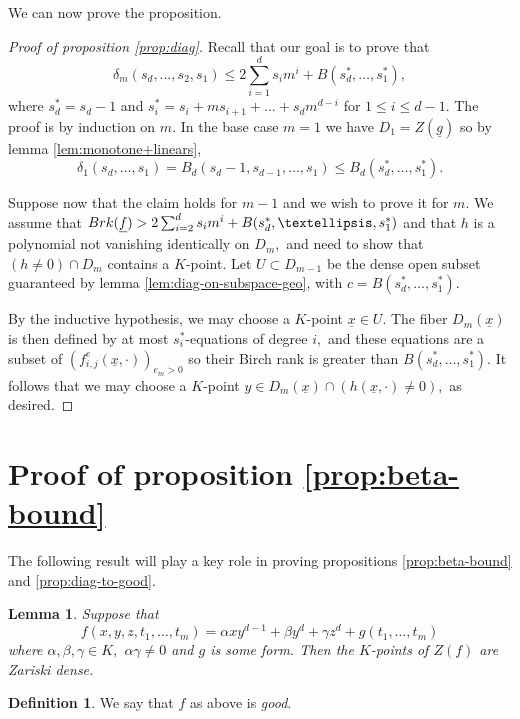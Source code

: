 \documentclass[10pt,a4paper]{amsart}
\let\ul\underline
\newtheorem{lemma}[theorem]{Lemma}
\theoremstyle{definition}
\newtheorem{definition}[theorem]{Definition}
\newcommand{\brk}{\textnormal{Brk}}
\begin{document}
We can now prove the proposition.

\begin{proof}[Proof of proposition  \ref{prop:diag}]
    Recall that our goal is to prove that
     \[
    \delta_m(s_d,\ldots,s_2,s_1) \le 2\sum_{i=1}^d s_im^i+B(s^*_d,\ldots,s^*_1),
    \]
    where $s^*_d = s_d-1$ and $s^*_i = s_i+ms_{i+1}+\ldots+s_dm^{d-i}$ for $1\le i\le d-1.$ The proof is by induction on $m.$ In the base case $m=1$ we have $D_1 = Z(\ul{g})$ so by lemma \ref{lem:monotone+linears}, 
    \[
    \delta_1(s_d,\ldots,s_1) = B_d(s_d-1,s_{d-1},\ldots,s_1) \le B_d(s_d^*,\ldots,s_1^*).
    \] 
    
    Suppose now that the claim holds for $m-1$ and we wish to prove it for $m.$ We assume that $\brk(\ul{f}) > 2\sum_{i=2}^d s_im^i+B(s^*_d,\ldots,s^*_1)$ and that $h$ is a polynomial not vanishing identically on $D_m,$ and need to show that $(h\neq 0)\cap D_m$ contains a $K$-point. Let $U\subset D_{m-1}$ be the dense open subset guaranteed by lemma \ref{lem:diag-on-subspace-geo}, with $c = B(s^*_d,\ldots,s^*_1).$ 
     
    By the inductive hypothesis, we may choose a $K$-point $\ul{x}\in U.$ The fiber $D_m(\ul{x})$ is then defined by at most $s_i^*$-equations of degree $i,$ and these equations are a subset of $(f_{i,j}^e(\ul{x},\cdot))_{e_m>0}$ so their Birch rank is greater than $B(s^*_d,\ldots,s^*_1).$ It follows that we may choose a $K$-point $y\in D_m(\ul{x}) \cap (h(\ul{x},\cdot)\neq 0),$ as desired.  
\end{proof}


    \section{Proof of proposition \ref{prop:beta-bound}}

    The following result \cite[Proposition 4.4]{BDS} will play a key role in proving propositions \ref{prop:beta-bound} and \ref{prop:diag-to-good}. 

    \begin{lemma}\label{lem:good-subspace}
        Suppose that
        \[
        f(x,y,z,t_1,\ldots,t_m) = \alpha xy^{d-1}+\beta y^d+\gamma z^d+g(t_1,\ldots,t_m) 
        \]
        where $\alpha,\beta,\gamma\in K,$ $\alpha\gamma \neq 0$ and $g$ is some form. Then the $K$-points of $Z(f)$ are Zariski dense.   
    \end{lemma}

    \begin{definition}
        We say that $f$ as above is \emph{good}.
    \end{definition}
\end{document}
